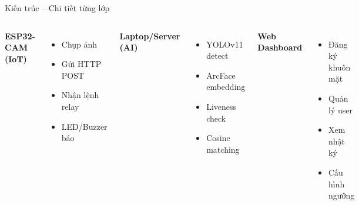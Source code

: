 \documentclass[aspectratio=169]{beamer}
\begin{document}
\begin{frame}{Kiến trúc -- Chi tiết từng lớp}
  \begin{columns}[T]
      \textbf{ESP32-CAM (IoT)}
      \begin{itemize}\small
        \item Chụp ảnh
        \item Gửi HTTP POST
        \item Nhận lệnh relay
        \item LED/Buzzer báo
      \end{itemize}

      \textbf{Laptop/Server (AI)}
      \begin{itemize}\small
        \item YOLOv11 detect
        \item ArcFace embedding
        \item Liveness check
        \item Cosine matching
      \end{itemize}

      \textbf{Web Dashboard}
      \begin{itemize}\small
        \item Đăng ký khuôn mặt
        \item Quản lý user
        \item Xem nhật ký
        \item Cấu hình ngưỡng
      \end{itemize}
  \end{columns}
\end{frame}
\end{document}
